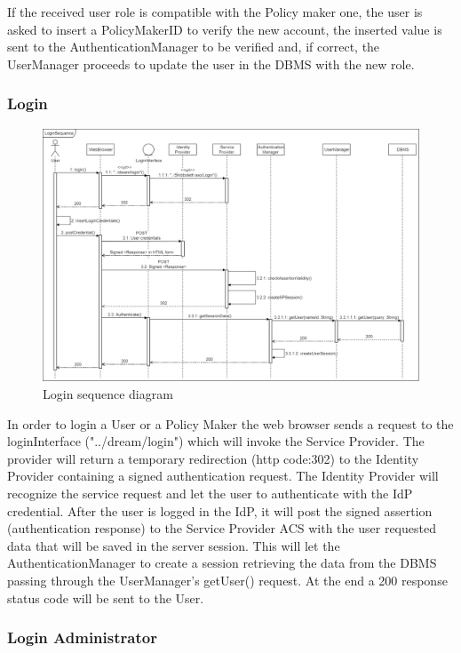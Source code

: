 If the received user role is compatible with the Policy maker one, the user is asked to insert a PolicyMakerID to verify the new account, the inserted value is sent to the AuthenticationManager to be verified and, if correct, the UserManager proceeds to update the user in the DBMS with the new role.

\subsubsection{Login}

\begin{figure}[h!]
        \centering
        \includegraphics[scale=0.25]{images/runtime_view/login_runtime_view_diagram.png}
        \caption{Login sequence diagram}
        \label{fig:login_sequence_diagram}
\end{figure}
\FloatBarrier
In order to login a User or a Policy Maker the web browser sends a request to the loginInterface ("../dream/login") which will invoke the Service Provider. The provider will return a temporary redirection (http code:302) to the Identity Provider containing a signed authentication request. The Identity Provider will recognize the service request and let the user to authenticate with the IdP credential. After the user is logged in the IdP, it will post the signed assertion (authentication response) to the Service Provider ACS with the user requested data that will be saved in the server session. This will let the AuthenticationManager to create a session retrieving the data from the DBMS passing through the UserManager's getUser() request. At the end a 200 response status code will be sent to the User.

\subsubsection{Login Administrator}

